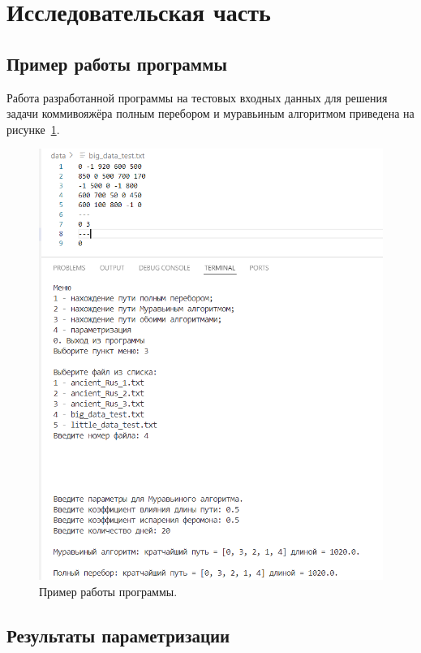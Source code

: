 \section{Исследовательская часть}

\subsection{Пример работы программы}

\hspace{1.25cm}
Работа разработанной программы на тестовых входных данных для решения задачи коммивояжёра полным перебором и муравьиным алгоритмом приведена на рисунке~\ref{fig:example}.

\begin{figure}[H]
    \centering
    \includegraphics[width=1\textwidth]{img/example.png}
    \caption{Пример работы программы.}
    \label{fig:example} %
\end{figure}


\subsection{Результаты параметризации}

